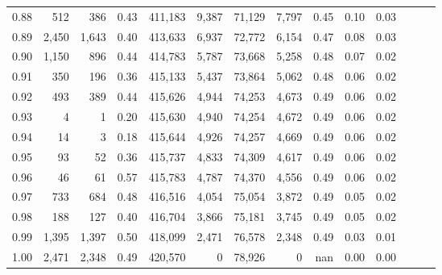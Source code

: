 \begin{tabular}{rrrrrrrrrrrrrr}
0.88 &     512 &    386 &  0.43 &  411,183 &    9,387 &  71,129 &   7,797 &  0.45 &  0.10 &      0.03 \\
0.89 &   2,450 &  1,643 &  0.40 &  413,633 &    6,937 &  72,772 &   6,154 &  0.47 &  0.08 &      0.03 \\
0.90 &   1,150 &    896 &  0.44 &  414,783 &    5,787 &  73,668 &   5,258 &  0.48 &  0.07 &      0.02 \\
0.91 &     350 &    196 &  0.36 &  415,133 &    5,437 &  73,864 &   5,062 &  0.48 &  0.06 &      0.02 \\
0.92 &     493 &    389 &  0.44 &  415,626 &    4,944 &  74,253 &   4,673 &  0.49 &  0.06 &      0.02 \\
0.93 &       4 &      1 &  0.20 &  415,630 &    4,940 &  74,254 &   4,672 &  0.49 &  0.06 &      0.02 \\
0.94 &      14 &      3 &  0.18 &  415,644 &    4,926 &  74,257 &   4,669 &  0.49 &  0.06 &      0.02 \\
0.95 &      93 &     52 &  0.36 &  415,737 &    4,833 &  74,309 &   4,617 &  0.49 &  0.06 &      0.02 \\
0.96 &      46 &     61 &  0.57 &  415,783 &    4,787 &  74,370 &   4,556 &  0.49 &  0.06 &      0.02 \\
0.97 &     733 &    684 &  0.48 &  416,516 &    4,054 &  75,054 &   3,872 &  0.49 &  0.05 &      0.02 \\
0.98 &     188 &    127 &  0.40 &  416,704 &    3,866 &  75,181 &   3,745 &  0.49 &  0.05 &      0.02 \\
0.99 &   1,395 &  1,397 &  0.50 &  418,099 &    2,471 &  76,578 &   2,348 &  0.49 &  0.03 &      0.01 \\
1.00 &   2,471 &  2,348 &  0.49 &  420,570 &        0 &  78,926 &       0 &   nan &  0.00 &      0.00 \\
\bottomrule
\end{tabular}
